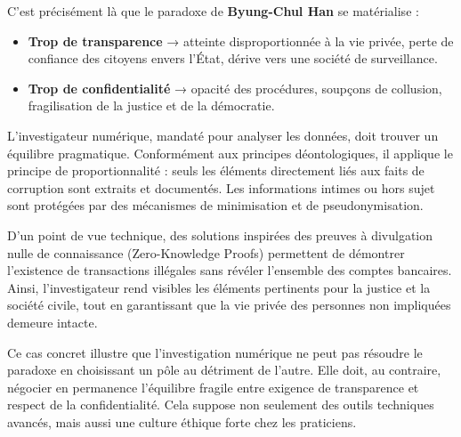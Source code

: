 \documentclass[12pt,a4paper]{article}
\begin{document}
	C’est précisément là que le paradoxe de \textbf{Byung-Chul Han} se matérialise :
	\begin{itemize}
		\item \textbf{Trop de transparence} → atteinte disproportionnée à la vie privée, perte de confiance des citoyens envers l’État, dérive vers une société de surveillance.
		\item \textbf{Trop de confidentialité} → opacité des procédures, soupçons de collusion, fragilisation de la justice et de la démocratie.
	\end{itemize}
	
	
	L’investigateur numérique, mandaté pour analyser les données, doit trouver un équilibre pragmatique. Conformément aux principes déontologiques, il applique le principe de proportionnalité : seuls les éléments directement liés aux faits de corruption sont extraits et documentés. Les informations intimes ou hors sujet sont protégées par des mécanismes de minimisation et de pseudonymisation.
	
	D’un point de vue technique, des solutions inspirées des preuves à divulgation nulle de connaissance (Zero-Knowledge Proofs) permettent de démontrer l’existence de transactions illégales sans révéler l’ensemble des comptes bancaires. Ainsi, l’investigateur rend visibles les éléments pertinents pour la justice et la société civile, tout en garantissant que la vie privée des personnes non impliquées demeure intacte.
	
	Ce cas concret illustre que l’investigation numérique ne peut pas résoudre le paradoxe en choisissant un pôle au détriment de l’autre. Elle doit, au contraire, négocier en permanence l’équilibre fragile entre exigence de transparence et respect de la confidentialité. Cela suppose non seulement des outils techniques avancés, mais aussi une culture éthique forte chez les praticiens.
	
\end{document}
